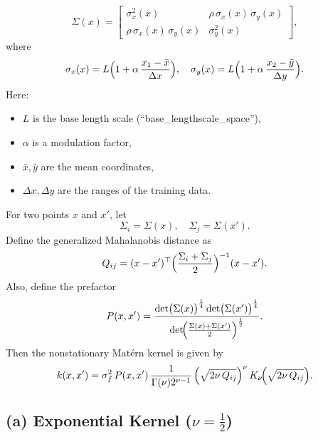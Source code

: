 \documentclass[11pt]{article}
\begin{document}


\[
\Sigma(x) = \begin{bmatrix}
\sigma_x^2(x) & \rho\,\sigma_x(x)\,\sigma_y(x) \\
\rho\,\sigma_x(x)\,\sigma_y(x) & \sigma_y^2(x)
\end{bmatrix},
\]
where
\[
\sigma_x(x)=L\Bigl({1+\alpha\,\frac{x_1-\bar{x}}{\Delta x}}\Bigr),\quad
\sigma_y(x)=L\Bigl({1+\alpha\,\frac{x_2-\bar{y}}{\Delta y}}\Bigr).
\]
Here:
\begin{itemize}[noitemsep]
    \item $L$ is the base length scale (``base\_lengthscale\_space''),
    \item $\alpha$ is a modulation factor,
    \item $\bar{x},\bar{y}$ are the mean coordinates,
    \item $\Delta x,\Delta y$ are the ranges of the training data.
\end{itemize}

For two points $x$ and $x'$, let
\[
\Sigma_i=\Sigma(x),\quad \Sigma_j=\Sigma(x').
\]
Define the generalized Mahalanobis distance as
\[
Q_{ij} = (x-x')^\top \Bigl({\frac{\Sigma_i+\Sigma_j}{2}}\Bigr)^{-1}(x-x').
\]
Also, define the prefactor
\[
P(x,x')=\frac{\det\bigl(\Sigma(x)\bigr)^{\frac{1}{4}}\det\bigl(\Sigma(x')\bigr)^{\frac{1}{4}}}{\det\!\Bigl({\frac{\Sigma(x)+\Sigma(x')}{2}}\Bigr)^{\frac{1}{2}}}.
\]
Then the nonstationary Matérn kernel is given by
\[
k(x,x')=\sigma_f^2\, P(x,x')\, \frac{1}{\Gamma(\nu)2^{\nu-1}}
\left(\sqrt{2\nu\,Q_{ij}}\right)^{\nu}K_{\nu}\!\Bigl({\sqrt{2\nu\,Q_{ij}}}\Bigr).
\]


\subsection*{(a) Exponential Kernel ($\nu=\frac{1}{2}$)}
\end{document}
